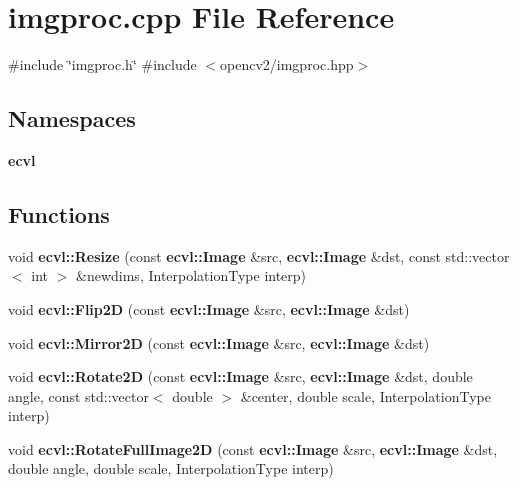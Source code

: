 \section{imgproc.\+cpp File Reference}
\label{imgproc_8cpp}
{\ttfamily \#include \char`\"{}imgproc.\+h\char`\"{}}\newline
{\ttfamily \#include $<$opencv2/imgproc.\+hpp$>$}\newline
\subsection*{Namespaces}
\begin{DoxyCompactItemize}
\item 
 \textbf{ ecvl}
\end{DoxyCompactItemize}
\subsection*{Functions}
\begin{DoxyCompactItemize}
\item 
void \textbf{ ecvl\+::\+Resize} (const \textbf{ ecvl\+::\+Image} \&src, \textbf{ ecvl\+::\+Image} \&dst, const std\+::vector$<$ int $>$ \&newdims, Interpolation\+Type interp)
\item 
void \textbf{ ecvl\+::\+Flip2D} (const \textbf{ ecvl\+::\+Image} \&src, \textbf{ ecvl\+::\+Image} \&dst)
\item 
void \textbf{ ecvl\+::\+Mirror2D} (const \textbf{ ecvl\+::\+Image} \&src, \textbf{ ecvl\+::\+Image} \&dst)
\item 
void \textbf{ ecvl\+::\+Rotate2D} (const \textbf{ ecvl\+::\+Image} \&src, \textbf{ ecvl\+::\+Image} \&dst, double angle, const std\+::vector$<$ double $>$ \&center, double scale, Interpolation\+Type interp)
\item 
void \textbf{ ecvl\+::\+Rotate\+Full\+Image2D} (const \textbf{ ecvl\+::\+Image} \&src, \textbf{ ecvl\+::\+Image} \&dst, double angle, double scale, Interpolation\+Type interp)
\end{DoxyCompactItemize}
